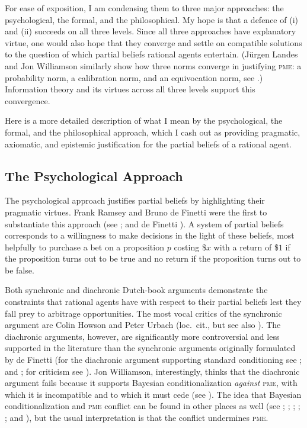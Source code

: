 \documentclass[phd,12pt,oneside]{ubcthesis}
\begin{document}
For ease of exposition, I am condensing them to three major
approaches: the psychological, the formal, and the philosophical. My
hope is that a defence of (i) and (ii) succeeds on all three levels.
Since all three approaches have explanatory virtue, one would also
hope that they converge and settle on compatible solutions to the
question of which partial beliefs rational agents entertain.
(J{\"u}rgen Landes and Jon Williamson similarly show how three norms
converge in justifying \textsc{pme}: a probability norm, a calibration
norm, and an equivocation norm, see .)
Information theory and its virtues across all three levels support
this convergence.

Here is a more detailed description of what I mean by the
psychological, the formal, and the philosophical approach, which I
cash out as providing pragmatic, axiomatic, and epistemic
justification for the partial beliefs of a rational agent.

\subsection{The Psychological Approach}
\label{subsec:oopiasee}

The psychological approach justifies partial beliefs by highlighting
their pragmatic virtues. Frank Ramsey and Bruno de Finetti were the
first to substantiate this approach (see ; and de
Finetti ). A system of partial beliefs
corresponds to a willingness to make decisions in the light of these
beliefs, most helpfully to purchase a bet on a proposition $p$ costing
\$$x$ with a return of \$$1$ if the proposition turns out to be true
and no return if the proposition turns out to be false.

Both synchronic and diachronic Dutch-book arguments demonstrate the
constraints that rational agents have with respect to their partial
beliefs lest they fall prey to arbitrage opportunities. The most vocal
critics of the synchronic argument are Colin Howson and Peter Urbach
(loc.\ cit., but see also ). The diachronic
arguments, however, are significantly more controversial and less
supported in the literature than the synchronic arguments originally
formulated by de Finetti (for the diachronic argument supporting
standard conditioning see ; and
; for criticism see
). Jon Williamson, interestingly,
thinks that the diachronic argument fails because it supports Bayesian
conditionalization \emph{against} \textsc{pme}, with which it is
incompatible and to which it must cede (see
). The idea that Bayesian conditionalization
and \textsc{pme} conflict can be found in other places as well (see
; ;
; ;
; and
), but the usual interpretation is
that the conflict undermines \textsc{pme}.
\end{document}
